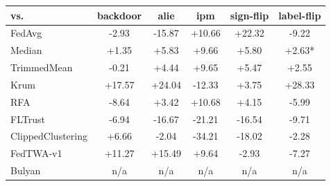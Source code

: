 \begin{tabular}{lccccc}
\toprule
vs. & backdoor & alie & ipm & sign-flip & label-flip \\
\midrule
FedAvg & -2.93 & -15.87 & +10.66 & +22.32 & -9.22 \\
Median & +1.35 & +5.83 & +9.66 & +5.80 & +2.63* \\
TrimmedMean & -0.21 & +4.44 & +9.65 & +5.47 & +2.55 \\
Krum & +17.57 & +24.04 & -12.33 & +3.75 & +28.33 \\
RFA & -8.64 & +3.42 & +10.68 & +4.15 & -5.99 \\
FLTrust & -6.94 & -16.67 & -21.21 & -16.54 & -9.71 \\
ClippedClustering & +6.66 & -2.04 & -34.21 & -18.02 & -2.28 \\
FedTWA-v1 & +11.27 & +15.49 & +9.64 & -2.93 & -7.27 \\
Bulyan & n/a & n/a & n/a & n/a & n/a \\
\bottomrule
\end{tabular}